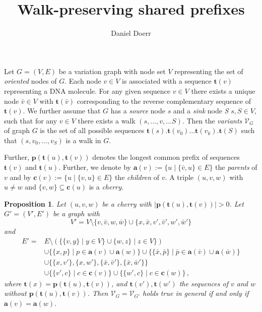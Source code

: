 \documentclass[a4paper]{article}
\title{Walk-preserving shared prefixes}
\author{Daniel Doerr}
\newtheorem{proposition}{Proposition}
\newcommand{\prefix}{\mathbf{p}}
\newcommand{\parent}{\mathbf{a}}
\newcommand{\child}{\mathbf{c}}
\newcommand{\seq}{\mathbf{t}}
\begin{document}
\maketitle

Let $G = (V, E)$ be a variation graph with node set $V$ representing the set of
\emph{oriented} nodes of $G$. Each node $v \in V$ is associated with a sequence
$\seq(v)$ representing a DNA molecule. For any given sequence $v \in V$ there exists
a unique node $\bar v \in V$ with $\seq(\bar v)$ corresponding to the 
reverse complementary sequence of $\seq(v)$. We further assume that $G$  has a
\emph{source} node $s$ and a \emph{sink} node \emph{S} $s, S \in V$, such that
for any $v \in V$ there exists a walk $(s,\ldots, v, \ldots S)$. Then the
\emph{variants} $\mathcal V_G$ of graph $G$ is the set of all possible sequences
$\seq(s).\seq(v_0)\ldots\seq(v_k).\seq(S)$ such that $(s, v_0, \ldots, v_S)$ is
a walk in $G$. 

Further, $\prefix(\seq(u), \seq(v))$ denotes the longest common prefix of
sequences $\seq(v)$ and $\seq(u)$. Further, we denote by $\parent(v) := \{u
\mid \{\bar v, u\} \in E\}$ the \emph{parents} of $v$ and by $\child(v) := \{u
\mid \{v, u\} \in E\}$ the \emph{children} of $v$. A triple $(u, v, w)$ with $u
\neq w$ and $\{v, w\} \subseteq\child(u)$ is a \emph{cherry}. 

\begin{proposition}
    Let $(u, v, w)$ be a cherry with $|\prefix(\seq(u), \seq(v))| > 0$. Let $G' =
    (V', E')$ be a graph with 
    \[
        V' = V \setminus \{v, \bar v, w, \bar w\} \cup \{x, \bar x, v', \bar
        v', w', \bar w'\}
    \]
    and 
    \begin{align*}
        E' = & E \setminus (\{\{v, y\} \mid y \in V\} \cup \{w, z\} \mid z \in
        V\}) \\
        & \cup \{\{x, p\} \mid p \in \parent(v) \cup \parent(w)\} \cup
        \{\{\bar x, \bar p \} \mid \bar p \in \parent(\bar v) \cup \parent(\bar
        w) \} \\
        & \cup \{\{x, v'\}, \{x, w'\}, \{\bar x, \bar v'\}, \{\bar x, \bar
        w'\}\} \\
        & \cup \{\{v', c\} \mid c \in \child(v) \} \cup \{\{w', c\} \mid c \in
        \child(w)\}\,,
    \end{align*}
    where $\seq(x) = \prefix(\seq(u), \seq(v))$, and $\seq(v'), \seq(w')$ the
    sequences of $v$ and $w$ without $\prefix(\seq(u), \seq(v))$. 
    Then $\mathcal V_G = \mathcal V_{G'}$ holds true in general if and only if
    $\parent(v) = \parent(w)$.
\end{proposition}
\end{document}
